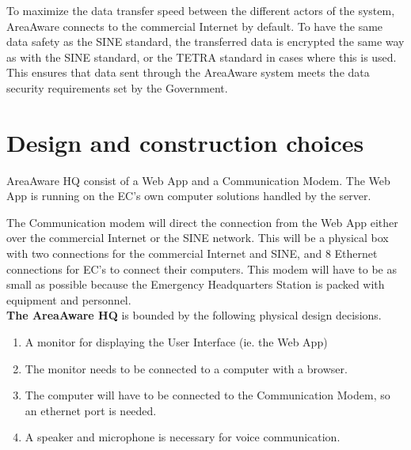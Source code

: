 To maximize the data transfer speed between the different actors of the system, AreaAware connects to the commercial Internet by default. To have the same data safety as the SINE standard, the transferred data is encrypted the same way as with the SINE standard, or the TETRA standard in cases where this is used. This ensures that data sent through the AreaAware system meets the data security requirements set by the Government.

\section{Design and construction choices}
AreaAware HQ consist of a Web App and a Communication Modem. The Web App is running on the EC's own computer solutions handled by the server. 

The Communication modem will direct the connection from the Web App either over the commercial Internet or the SINE network. This will be a physical box with two connections for the commercial Internet and SINE, and 8 Ethernet connections for EC's to connect their computers. This modem will have to be as small as possible because the Emergency Headquarters Station is packed with equipment and personnel.\\

\noindent \textbf{The AreaAware HQ} is bounded by the following physical design decisions.
\begin{enumerate}[label=D-HQ\arabic*,leftmargin=1.4cm]
	\item A monitor for displaying the User Interface (ie. the Web App)
	\item The monitor needs to be connected to a computer with a browser.
	\item The computer will have to be connected to the Communication Modem, so an ethernet port is needed.
	\item A speaker and microphone is necessary for voice communication. \\
\end{enumerate}

